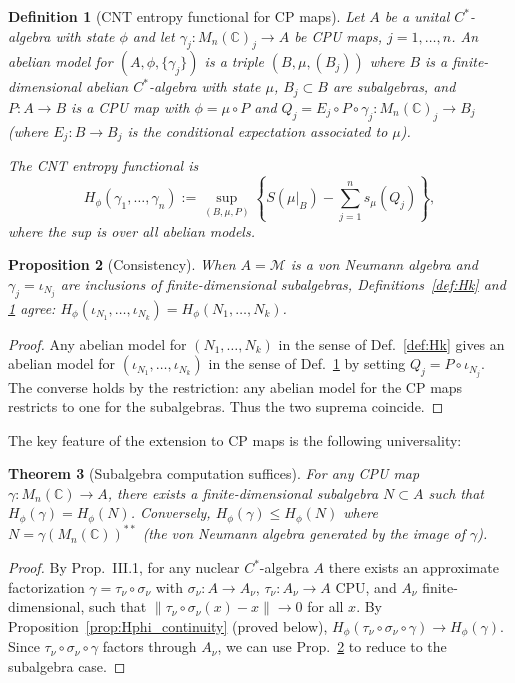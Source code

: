 \documentclass[12pt,a4paper]{article}
\newtheorem{theorem}{Theorem}[section]
\newtheorem{proposition}[theorem]{Proposition}
\newtheorem{definition}[theorem]{Definition}
\newcommand{\CC}{\mathbb{C}}
\newcommand{\Mn}{M_n(\CC)}
\newcommand{\vN}{\mathcal{M}}      %
\newcommand{\Hphi}{H_{\phi}}
\newcommand{\norm}[1]{\lVert #1 \rVert}
\begin{document}
\begin{definition}[CNT entropy functional for CP maps]\label{def:Hphi_cpmaps}
Let $A$ be a unital $C^*$-algebra with state $\phi$ and let
$\gamma_j:\Mn_j\to A$ be CPU maps, $j=1,\ldots,n$.
An \emph{abelian model} for $(A,\phi,\{\gamma_j\})$ is a triple $(B,\mu,(B_j))$
where $B$ is a finite-dimensional abelian $C^*$-algebra with state $\mu$,
$B_j\subset B$ are subalgebras, and $P:A\to B$ is a CPU map with $\phi=\mu\circ P$
and $Q_j=E_j\circ P\circ\gamma_j:\Mn_j\to B_j$ (where $E_j:B\to B_j$ is the
conditional expectation associated to $\mu$).

The \emph{CNT entropy functional} is
\begin{equation}\label{eq:Hphi_cp}
  \Hphi(\gamma_1,\ldots,\gamma_n)
  := \sup_{(B,\mu,P)}
  \left\{S(\mu|_B) - \sum_{j=1}^n s_\mu(Q_j)\right\},
\end{equation}
where the sup is over all abelian models.
\end{definition}

\begin{proposition}[Consistency]\label{prop:consistency}
When $A=\vN$ is a von Neumann algebra and $\gamma_j=\iota_{N_j}$ are inclusions of
finite-dimensional subalgebras, Definitions~\ref{def:Hk} and \ref{def:Hphi_cpmaps}
agree: $\Hphi(\iota_{N_1},\ldots,\iota_{N_k})=\Hphi(N_1,\ldots,N_k)$.
\end{proposition}

\begin{proof}
Any abelian model for $(N_1,\ldots,N_k)$ in the sense of Def.~\ref{def:Hk} gives
an abelian model for $(\iota_{N_1},\ldots,\iota_{N_k})$ in the sense of
Def.~\ref{def:Hphi_cpmaps} by setting $Q_j=P\circ\iota_{N_j}$.  The converse holds
by the restriction: any abelian model for the CP maps restricts to one for the
subalgebras.  Thus the two suprema coincide.
\end{proof}

The key feature of the extension to CP maps is the following universality:

\begin{theorem}[Subalgebra computation suffices]\label{thm:subalgebra_compute}
For any CPU map $\gamma:\Mn\to A$, there exists a finite-dimensional subalgebra
$N\subset A$ such that $\Hphi(\gamma)=\Hphi(N)$.
Conversely, $\Hphi(\gamma)\le\Hphi(N)$ where $N=\gamma(\Mn)^{**}$ (the
von Neumann algebra generated by the image of $\gamma$).
\end{theorem}

\begin{proof}
By \cite{cnt87} Prop.~III.1, for any nuclear $C^*$-algebra $A$ there exists an
approximate factorization $\gamma=\tau_\nu\circ\sigma_\nu$ with $\sigma_\nu:A\to A_\nu$,
$\tau_\nu:A_\nu\to A$ CPU, and $A_\nu$ finite-dimensional, such that
$\norm{\tau_\nu\circ\sigma_\nu(x)-x}\to 0$ for all $x$.
By Proposition~\ref{prop:Hphi_continuity} (proved below), $\Hphi(\tau_\nu\circ\sigma_\nu\circ\gamma)\to\Hphi(\gamma)$.
Since $\tau_\nu\circ\sigma_\nu\circ\gamma$ factors through $A_\nu$, we can use
Prop.~\ref{prop:consistency} to reduce to the subalgebra case.
\end{proof}
\end{document}
